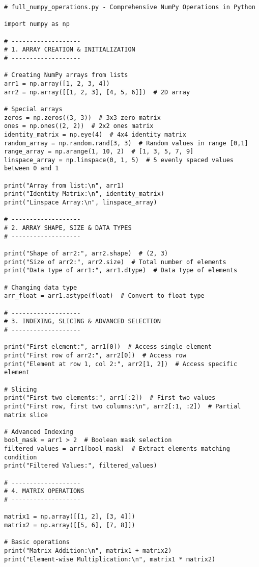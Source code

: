 \begin{verbatim}
# full_numpy_operations.py - Comprehensive NumPy Operations in Python

import numpy as np

# -------------------
# 1. ARRAY CREATION & INITIALIZATION
# -------------------

# Creating NumPy arrays from lists
arr1 = np.array([1, 2, 3, 4])
arr2 = np.array([[1, 2, 3], [4, 5, 6]])  # 2D array

# Special arrays
zeros = np.zeros((3, 3))  # 3x3 zero matrix
ones = np.ones((2, 2))  # 2x2 ones matrix
identity_matrix = np.eye(4)  # 4x4 identity matrix
random_array = np.random.rand(3, 3)  # Random values in range [0,1]
range_array = np.arange(1, 10, 2)  # [1, 3, 5, 7, 9]
linspace_array = np.linspace(0, 1, 5)  # 5 evenly spaced values between 0 and 1

print("Array from list:\n", arr1)
print("Identity Matrix:\n", identity_matrix)
print("Linspace Array:\n", linspace_array)

# -------------------
# 2. ARRAY SHAPE, SIZE & DATA TYPES
# -------------------

print("Shape of arr2:", arr2.shape)  # (2, 3)
print("Size of arr2:", arr2.size)  # Total number of elements
print("Data type of arr1:", arr1.dtype)  # Data type of elements

# Changing data type
arr_float = arr1.astype(float)  # Convert to float type

# -------------------
# 3. INDEXING, SLICING & ADVANCED SELECTION
# -------------------

print("First element:", arr1[0])  # Access single element
print("First row of arr2:", arr2[0])  # Access row
print("Element at row 1, col 2:", arr2[1, 2])  # Access specific element

# Slicing
print("First two elements:", arr1[:2])  # First two values
print("First row, first two columns:\n", arr2[:1, :2])  # Partial matrix slice

# Advanced Indexing
bool_mask = arr1 > 2  # Boolean mask selection
filtered_values = arr1[bool_mask]  # Extract elements matching condition
print("Filtered Values:", filtered_values)

# -------------------
# 4. MATRIX OPERATIONS
# -------------------

matrix1 = np.array([[1, 2], [3, 4]])
matrix2 = np.array([[5, 6], [7, 8]])

# Basic operations
print("Matrix Addition:\n", matrix1 + matrix2)
print("Element-wise Multiplication:\n", matrix1 * matrix2)


\end{verbatim}
